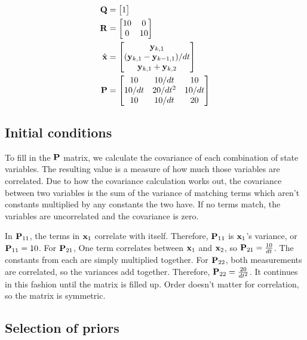 \begin{align}
  \mathbf{Q} &= \begin{bmatrix}1\end{bmatrix} \\
  \mathbf{R} &=
  \begin{bmatrix}
    10 & 0 \\
    0 & 10
  \end{bmatrix} \\
  \hat{\mathbf{x}} &=
  \begin{bmatrix}
    \mathbf{y}_{k,1} \\
    (\mathbf{y}_{k,1} - \mathbf{y}_{k-1,1})/dt \\
    \mathbf{y}_{k,1} + \mathbf{y}_{k,2}
  \end{bmatrix} \\
  \mathbf{P} &=
  \begin{bmatrix}
    10 & 10/dt & 10 \\
    10/dt & 20/dt^2 & 10/dt \\
    10 & 10/dt & 20
  \end{bmatrix}
\end{align}

\subsection{Initial conditions}

To fill in the $\mathbf{P}$ matrix, we calculate the covariance of each combination
of state variables. The resulting value is a measure of how much those variables
are correlated. Due to how the covariance calculation works out, the covariance
between two variables is the sum of the variance of matching terms which aren't
constants multiplied by any constants the two have. If no terms match, the
variables are uncorrelated and the covariance is zero.

In $\mathbf{P}_{11}$, the terms in $\mathbf{x}_1$ correlate with itself. Therefore,
$\mathbf{P}_{11}$ is $\mathbf{x}_1$'s variance, or $\mathbf{P}_{11} = 10$. For
$\mathbf{P}_{21}$, One term correlates between $\mathbf{x}_1$ and $\mathbf{x}_2$, so
$\mathbf{P}_{21} = \frac{10}{dt}$. The constants from each are simply multiplied
together. For $\mathbf{P}_{22}$, both measurements are correlated, so the variances
add together. Therefore, $\mathbf{P}_{22} = \frac{20}{dt^2}$. It continues in this
fashion until the matrix is filled up. Order doesn't matter for correlation, so
the matrix is symmetric.

\subsection{Selection of priors}

